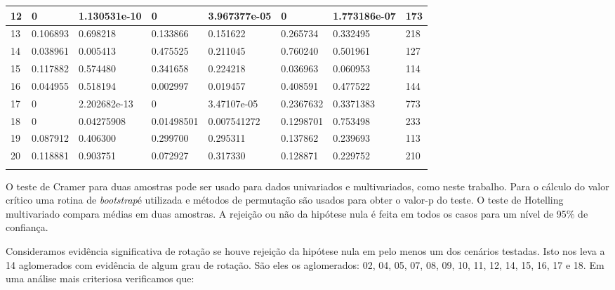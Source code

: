 \begin{table}[H]
{\begin{tabular}{|l|l|l|l|l|l|l|l|}
                   12  &  {\color{red}0}  & {\color{red}1.130531e-10} & {\color{red}0} & 	3.967377e-05 &	{\color{red}0} &	1.773186e-07 &	173 \\ \hline
                   13  &  0.106893 & 0.698218 &	0.133866 &	0.151622 & 0.265734 & 0.332495 & 218 \\ \hline
                   14  &  {\color{red}0.038961} & 0.005413 &	0.475525 &  0.211045 & 0.760240 & 0.501961 & 127 \\ \hline
                   15  &  0.117882 & 0.574480 &	0.341658 &	0.224218 & {\color{red}0.036963} & 0.060953 & 114 \\ \hline
                   16  &  {\color{red}0.044955} & 0.518194 &	{\color{red}0.002997} &  {\color{red}0.019457} & 0.408591 & 0.477522 & 144  \\ \hline
                   17  &  {\color{red}0}  & {\color{red}2.202682e-13} & {\color{red}0} &  3.47107e-05 & 0.2367632 & 0.3371383 & 773 \\ \hline
                   18  &  {\color{red}0} & {\color{red}0.04275908} & {\color{red}0.01498501} &  {\color{red}0.007541272} & 0.1298701 & 0.753498 & 233 \\ \hline
                   19  &  0.087912 & 0.406300 &	0.299700 &	0.295311 & 0.137862 & 0.239693 & 113 \\ \hline
                   20  &  0.118881 & 0.903751 &	0.072927 &	0.317330 & 0.128871 & 0.229752 & 210 \\ \hline
\label{tab:selec20T}
\end{tabular}
}
\end{table}

O teste de Cramer para duas amostras pode ser usado para dados univariados e multivariados, como neste trabalho. Para o cálculo do valor crítico uma rotina de \textit{bootstrap}é utilizada e métodos de permutação são usados para obter o valor-p do teste. O teste de Hotelling multivariado compara médias em duas amostras. A rejeição ou não da hipótese nula é feita em todos os casos para um nível de 95\% de confiança. 

Consideramos evidência significativa de rotação se houve rejeição da hipótese nula em pelo menos um dos cenários testadas. Isto nos leva a 14 aglomerados com evidência de algum grau de rotação. São eles os aglomerados: 02, 04, 05, 07, 08, 09, 10, 11, 12, 14, 15, 16, 17 e 18. Em uma análise mais criteriosa verificamos que:

